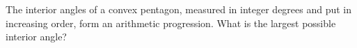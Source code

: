 The interior angles of a convex pentagon, measured in integer degrees and put in increasing order, form an arithmetic progression. What is the largest possible interior angle?
